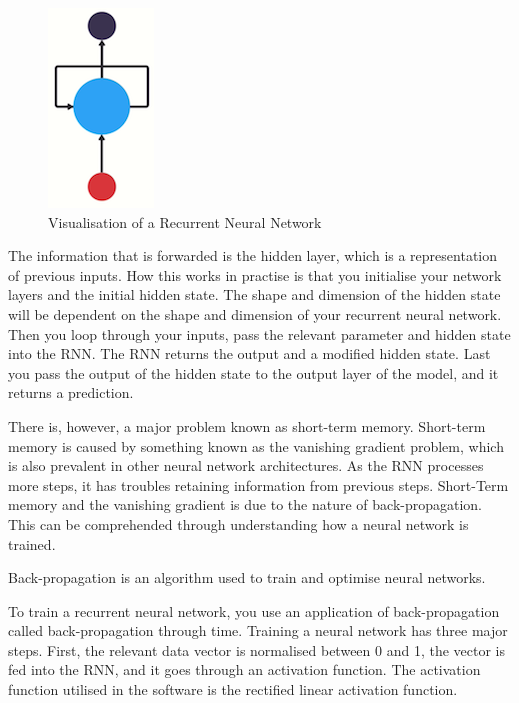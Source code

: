 \begin{figure}[H]
    \centering
    \includegraphics[width=.2\linewidth]{Images/rnn.png}
    \caption{Visualisation of a Recurrent Neural Network}
\end{figure}

The information that is forwarded is the hidden layer, which is a representation of previous inputs. How this works in practise is that you initialise your network layers and the initial hidden state. The shape and dimension of the hidden state will be dependent on the shape and dimension of your recurrent neural network. Then you loop through your inputs, pass the relevant parameter and hidden state into the RNN. The RNN returns the output and a modified hidden state. Last you pass the output of the hidden state to the output layer of the model, and it returns a prediction. 

There is, however, a major problem known as short-term memory. Short-term memory is caused by something known as the vanishing gradient problem, which is also prevalent in other neural network architectures. As the RNN processes more steps, it has troubles retaining information from previous steps. Short-Term memory and the vanishing gradient is due to the nature of back-propagation. This can be comprehended through understanding how a neural network is trained\cite{intro_rnn}.

\begin{definition}
Back-propagation is an algorithm used to train and optimise neural networks.
\end{definition}

To train a recurrent neural network, you use an application of back-propagation called back-propagation through time. Training a neural network has three major steps. First, the relevant data vector is normalised between 0 and 1, the vector is fed into the RNN, and it goes through an activation function. The activation function utilised in the software is the rectified linear activation function\cite{lstm_rnn}. 

